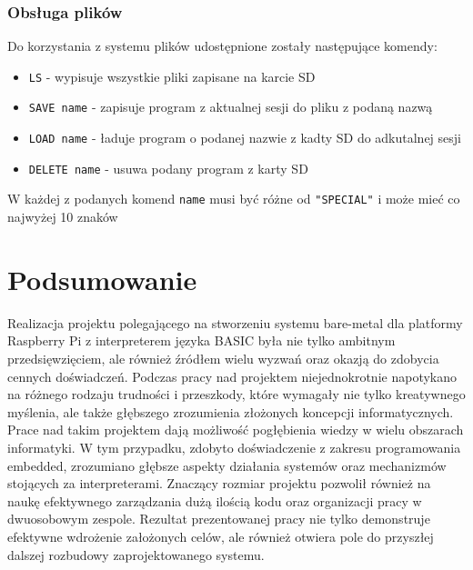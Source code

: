 \documentclass[shortabstract]{iithesis}
\begin{document}
\subsection{Obsługa plików}
Do korzystania z systemu plików udostępnione zostały następujące komendy:
\begin{itemize}
 \item \texttt{LS} - wypisuje wszystkie pliki zapisane na karcie SD
 \item \texttt{SAVE name} - zapisuje program z aktualnej sesji do pliku z podaną nazwą
 \item \texttt{LOAD name} - ładuje program o podanej nazwie z kadty SD do adkutalnej sesji
 \item \texttt{DELETE name} - usuwa podany program z karty SD
\end{itemize}
W każdej z podanych komend \texttt{name} musi być różne od \texttt{"SPECIAL"} i może mieć co najwyżej 10 znaków

\chapter*{Podsumowanie}
Realizacja projektu polegającego na stworzeniu systemu bare-metal dla platformy Raspberry Pi z interpreterem języka BASIC była nie tylko ambitnym przedsięwzięciem, ale również źródłem wielu wyzwań oraz okazją do zdobycia cennych doświadczeń. Podczas pracy nad projektem niejednokrotnie napotykano na różnego rodzaju trudności i przeszkody, które wymagały nie tylko kreatywnego myślenia, ale także głębszego zrozumienia złożonych koncepcji informatycznych.
Prace nad takim projektem dają możliwość pogłębienia wiedzy w wielu obszarach informatyki. W tym przypadku, zdobyto doświadczenie z zakresu programowania embedded, zrozumiano głębsze aspekty działania systemów oraz mechanizmów stojących za interpreterami. Znaczący rozmiar projektu pozwolił również na naukę efektywnego zarządzania dużą ilością kodu oraz organizacji pracy w dwuosobowym zespole.
Rezultat prezentowanej pracy nie tylko demonstruje efektywne wdrożenie założonych celów, ale również otwiera pole do przyszłej dalszej rozbudowy zaprojektowanego systemu. 
\end{document}
